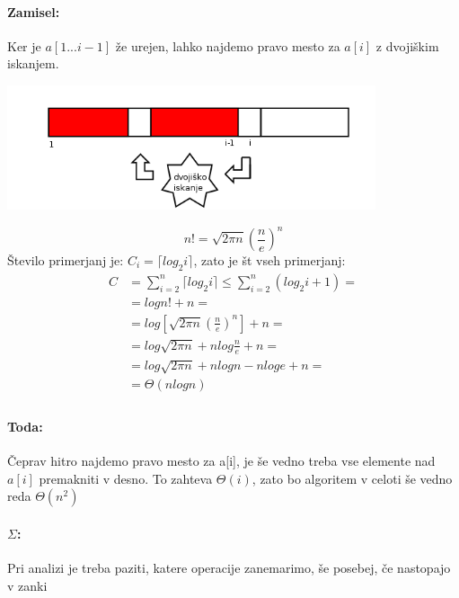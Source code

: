 \documentclass[a4paper,10pt]{article}
\begin{document}
\paragraph{Zamisel:}
Ker je $a[1...i-1]$ \v ze urejen, lahko najdemo pravo mesto za $a[i]$ z dvoji\v skim iskanjem.\\
	\begin{center}
	\includegraphics[width=10.85cm,height=3.65cm]{Slike/NavadnoVstavljanjeBinSearch.png}
	\end{center}
\begin{equation}
n != \sqrt{2 \pi n}(\frac{n}{e})^n
\label{Stirling}
\end{equation}
\v Stevilo primerjanj je: $C_i=\lceil log_{2}i \rceil$, zato je \v st vseh primerjanj:
$$
\begin{array}{rl}
C & = \sum_{i=2}^n \lceil log_{2}i \rceil \leq \sum_{i=2}^{n} (log_{2}i+1)=\\
  & = logn!+n=\\
  & = log[\sqrt{2\pi n}(\frac{n}{e})^n]+n=\\
  & = log\sqrt{2\pi n}+nlog\frac{n}{e}+n=\\
  & = log\sqrt{2\pi n}+nlogn-nloge+n=\\
  & = \Theta(nlogn)\\
\end{array}
$$

\paragraph{Toda:}
\v Ceprav hitro najdemo pravo mesto za a[i], je \v se vedno treba vse elemente nad $a[i]$ premakniti v desno. To zahteva $\Theta(i)$, zato bo algoritem v celoti \v se vedno reda $\Theta(n^2)$

\paragraph{$\Sigma$:}
Pri analizi je treba paziti, katere operacije zanemarimo, \v se posebej, \v ce nastopajo v zanki
\end{document}
